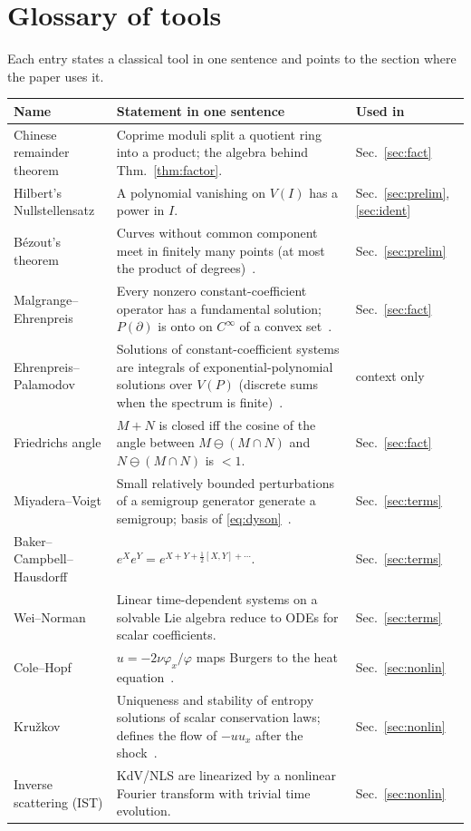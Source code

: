 \documentclass[11pt,a4paper]{article}
\theoremstyle{definition}
\newcommand{\Var}{V}
\begin{document}


\clearpage
\appendix
\section{Glossary of tools}\label{app:gloss}
Each entry states a classical tool in one sentence and points to the section where the paper uses it.
\begin{center}\small
\begin{tabular}{@{}L{3.4cm}L{9.2cm}L{2.0cm}@{}}
\toprule
Name & Statement in one sentence & Used in\\\midrule
Chinese remainder theorem & Coprime moduli split a quotient ring into a product; the algebra behind Thm.~\ref{thm:factor}. & Sec.~\ref{sec:fact}\\
Hilbert's Nullstellensatz & A polynomial vanishing on $\Var(I)$ has a power in $I$. & Sec.~\ref{sec:prelim}, \ref{sec:ident}\\
B\'ezout's theorem & Curves without common component meet in finitely many points (at most the product of degrees)~\cite{fu}. & Sec.~\ref{sec:prelim}\\
Malgrange--Ehrenpreis & Every nonzero constant-coefficient operator has a fundamental solution; $P(\partial)$ is onto on $C^\infty$ of a convex set~\cite{eh,ma}. & Sec.~\ref{sec:fact}\\
Ehrenpreis--Palamodov & Solutions of constant-coefficient systems are integrals of exponential-polynomial solutions over $\Var(P)$ (discrete sums when the spectrum is finite)~\cite{pa}. & context only\\
Friedrichs angle & $M+N$ is closed iff the cosine of the angle between $M\ominus(M\cap N)$ and $N\ominus(M\cap N)$ is $<1$. & Sec.~\ref{sec:fact}\\
Miyadera--Voigt & Small relatively bounded perturbations of a semigroup generator generate a semigroup; basis of \eqref{eq:dyson}~\cite{en}. & Sec.~\ref{sec:terms}\\
Baker--Campbell--Hausdorff & $e^Xe^Y=e^{X+Y+\frac12[X,Y]+\cdots}$. & Sec.~\ref{sec:terms}\\
Wei--Norman & Linear time-dependent systems on a solvable Lie algebra reduce to ODEs for scalar coefficients. & Sec.~\ref{sec:terms}\\
Cole--Hopf & $u=-2\nu\varphi_x/\varphi$ maps Burgers to the heat equation~\cite{ch}. & Sec.~\ref{sec:nonlin}\\
Kru\v zkov & Uniqueness and stability of entropy solutions of scalar conservation laws; defines the flow of $-uu_x$ after the shock~\cite{kr}. & Sec.~\ref{sec:nonlin}\\
Inverse scattering (IST) & KdV/NLS are linearized by a nonlinear Fourier transform with trivial time evolution. & Sec.~\ref{sec:nonlin}\\
\bottomrule
\end{tabular}
\end{center}
\end{document}
